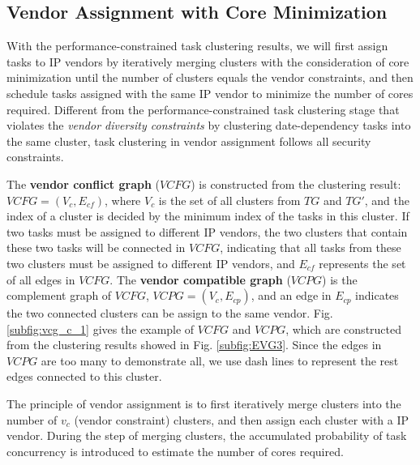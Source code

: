 \documentclass[10pt,journal]{IEEEtran}
\begin{document}
\subsection{Vendor Assignment with Core Minimization}

With the performance-constrained task clustering results, we will first assign tasks to IP vendors by iteratively merging clusters with the consideration of core minimization until the number of clusters equals the vendor constraints, and then schedule tasks assigned with the same IP vendor to minimize the number of cores required. Different from the performance-constrained task clustering stage that violates the \textit{vendor diversity constraints} by clustering date-dependency tasks into the same cluster, task clustering in vendor assignment follows all security constraints.%

The \textbf{vendor conflict graph} ($VCFG$) is constructed from the clustering result: $VCFG=(V_c, E_{cf})$, where $V_c$ is the set of all clusters from $TG$ and $TG'$, and the index of a cluster is decided by the minimum index of the tasks in this cluster. If two tasks must be assigned to different IP vendors, the two clusters that contain these two tasks will be connected in $VCFG$, indicating that all tasks from these two clusters must be assigned to different IP vendors, and $E_{cf}$ represents the set of all edges in $VCFG$. The \textbf{vendor compatible graph} ($VCPG$) is the complement graph of $VCFG$, $VCPG=(V_c, E_{cp})$, and an edge in $E_{cp}$ indicates the two connected clusters can be assign to the same vendor. Fig. \ref{subfig:vcg_c_1} gives the example of $VCFG$ and $VCPG$, which are constructed from the clustering results showed in Fig. \ref{subfig:EVG3}. Since the edges in $VCPG$ are too many to demonstrate all, we use dash lines to represent the rest edges connected to this cluster.

The principle of vendor assignment is to first iteratively merge clusters into the number of $v_c$ (vendor constraint) clusters, and then assign each cluster with a IP vendor. During the step of merging clusters, the accumulated probability of task concurrency is introduced to estimate the number of cores required.
\end{document}
